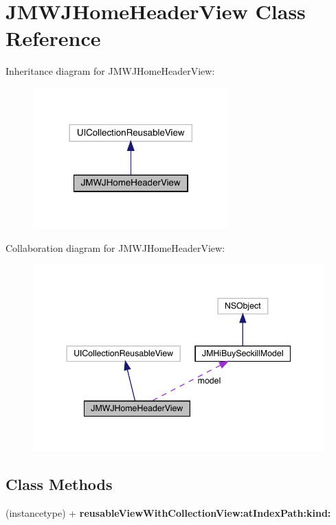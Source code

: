 \hypertarget{interface_j_m_w_j_home_header_view}{}\section{J\+M\+W\+J\+Home\+Header\+View Class Reference}
\label{interface_j_m_w_j_home_header_view}


Inheritance diagram for J\+M\+W\+J\+Home\+Header\+View\+:\nopagebreak
\begin{figure}[H]
\begin{center}
\leavevmode
\includegraphics[width=214pt]{interface_j_m_w_j_home_header_view__inherit__graph}
\end{center}
\end{figure}


Collaboration diagram for J\+M\+W\+J\+Home\+Header\+View\+:\nopagebreak
\begin{figure}[H]
\begin{center}
\leavevmode
\includegraphics[width=344pt]{interface_j_m_w_j_home_header_view__coll__graph}
\end{center}
\end{figure}
\subsection*{Class Methods}
\begin{DoxyCompactItemize}
\item 
\mbox{\label{interface_j_m_w_j_home_header_view_a50c5b05aba98f929e0bfea012dfe50a2}} 
(instancetype) + {\bfseries reusable\+View\+With\+Collection\+View\+:at\+Index\+Path\+:kind\+:}
\end{DoxyCompactItemize}
